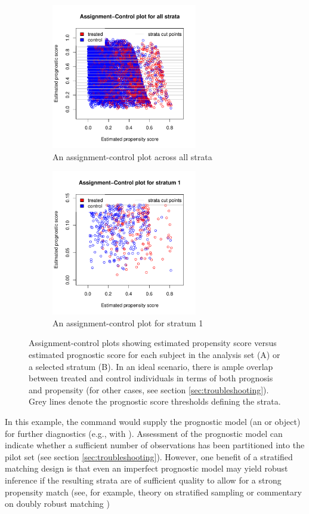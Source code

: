 \begin{figure}[htbp]
\centering
    \begin{subfigure}[htbp]{2.5in}
        \centering
        \includegraphics[width = 2.5in]{Figure2A.pdf}
        \caption{An assignment-control plot across all strata}
    \end{subfigure}
    \begin{subfigure}[htbp]{2.5in}
        \centering
        \includegraphics[width = 2.5in]{Figure2B.pdf}
        \caption{An assignment-control plot for stratum 1}
    \end{subfigure}
    \caption{\label{fig:AC_simulated} Assignment-control plots \citep{aikens2020pilot} showing estimated propensity score versus estimated prognostic score for each subject in the analysis set (A) or a selected stratum (B).  In an ideal scenario, there is ample overlap between treated and control individuals in terms of both prognosis and propensity (for other cases, see section \ref{sec:troubleshooting}).  Grey lines denote the prognostic score thresholds defining the strata.}
\end{figure}

In this example, the command  would supply the prognostic model (an  or  object) for further diagnostics (e.g., with ). Assessment of the prognostic model can indicate whether a sufficient number of observations has been partitioned into the pilot set (see section \ref{sec:troubleshooting}).  However, one benefit of a stratified matching design is that even an imperfect prognostic model may yield robust inference if the resulting strata are of sufficient quality to allow for a strong propensity match (see, for example, theory on stratified sampling \citep{lohr2019sampling} or commentary on doubly robust matching \citep{leacy2014joint, antonelli2018doubly})

